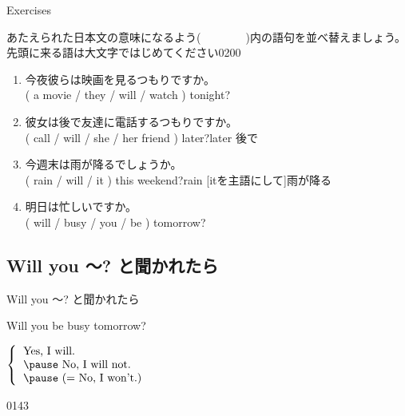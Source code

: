\documentclass[aspectratio=169,xcolor={dvipsnames,table}]{beamer}
\newcommand{\myaudio}[1]{\href{#1}{\faVolumeUp}}
\begin{document}
\begin{frame}[plain]{Exercises}

{\small あたえられた日本文の意味になるよう(~~~~~~~~)内の語句を並べ替えましょう。
先頭に来る語は大文字ではじめてください}\mbox{}\hfill{\tiny 0200}\,{\scriptsize \myaudio{./audio/012_will_07.mp3}}

\begin{enumerate}
 \item 今夜彼らは映画を見るつもりですか。\\
 ( a movie / they / will / watch ) tonight?  \\
 \item 彼女は後で友達に電話するつもりですか。\\
 ( call / will / she / her friend ) later?\hfill{\scriptsize later  後で} \\
 \item 今週末は雨が降るでしょうか。\\
 ( rain / will / it ) this weekend?\hfill{\scriptsize rain   [itを主語にして]雨が降る}\\
 \item 明日は忙しいですか。\\
 ( will / busy  / you / be ) tomorrow?  \\
\end{enumerate}
 \end{frame}

\subsection{Will you 〜? と聞かれたら}
\begin{frame}[plain]{Will you 〜? と聞かれたら}
 \Large

Will you be busy tomorrow?

\vspace{20pt}
\pause

\mbox{}\hspace{100pt}$\left\{\begin{tabular}{l}
         \text{Yes, I will.}\\\pause
         \text{No, I will not.}\\\pause
         \text{(}= \text{No, I won't.)}
        \end{tabular}\right.$

\mbox{}\hfill{\tiny 0143}\,{\scriptsize \myaudio{./audio/012_will_08.mp3}}
\end{frame}
\end{document}
